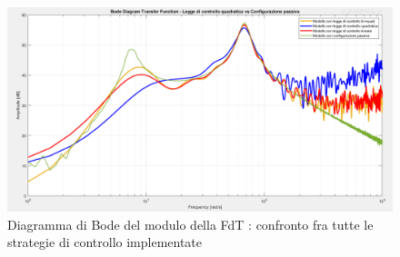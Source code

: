\begin{figure}[htb]
	\centering
	\includegraphics[scale=0.26]{figure/confrontofinale.png}
	\caption{Diagramma di Bode del modulo della FdT : confronto fra tutte le strategie di controllo implementate}
	\label{fig:confrontofinale}
\end{figure}



